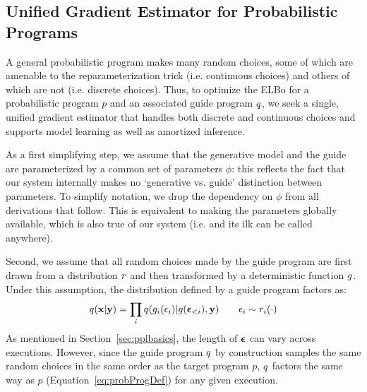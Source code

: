 \subsection{Unified Gradient Estimator for Probabilistic Programs}
\label{sec:optimization:unifiedEstimator}

A general probabilistic program makes many random choices, some of which are amenable to the reparameterization trick (i.e. continuous choices) and others of which are not (i.e. discrete choices). Thus, to optimize the ELBo for a probabilistic program $p$ and an associated guide program $q$, we seek a single, unified gradient estimator that handles both discrete and continuous choices and supports model learning as well as amortized inference.

As a first simplifying step, we assume that the generative model and the guide are parameterized by a common set of parameters $\phi$: this reflects the fact that our system internally makes no `generative vs. guide' distinction between parameters. To simplify notation, we drop the dependency on $\phi$ from all derivations that follow. This is equivalent to making the parameters globally available, which is also true of our system (i.e.  and its ilk can be called anywhere).

Second, we assume that all random choices made by the guide program are first drawn from a distribution $r$ and then transformed by a deterministic function $g$. Under this assumption, the distribution defined by a guide program factors as:
\begin{equation*}
q(\mathbf{x} | \mathbf{y}) = \prod_i q(g_i(\epsilon_i) | g(\bm{\epsilon}_{<i}), \mathbf{y}) \hspace{2em} \epsilon_i \sim r_i(\cdot)
\end{equation*}
As mentioned in Section~\ref{sec:pplbasics}, the length of $\bm{\epsilon}$ can vary across executions. However, since the guide program $q$ by construction samples the same random choices in the same order as the target program $p$, $q$ factors the same way as $p$ (Equation~\ref{eq:probProgDef}) for any given execution. 


